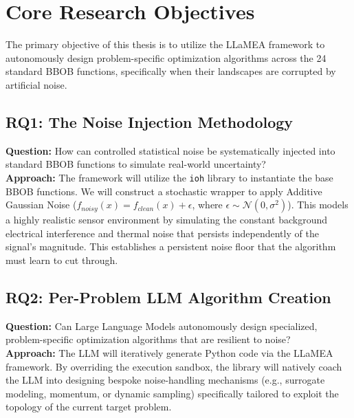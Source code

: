 
\chapter{Core Research Objectives}\label{chap:objectives}

The primary objective of this thesis is to utilize the LLaMEA framework to autonomously design problem-specific optimization algorithms across the 24 standard BBOB functions, specifically when their landscapes are corrupted by artificial noise.

\section{RQ1: The Noise Injection Methodology}
\textbf{Question:} How can controlled statistical noise be systematically injected into standard BBOB functions to simulate real-world uncertainty? \\
\textbf{Approach:} The framework will utilize the \texttt{ioh} library to instantiate the base BBOB functions. We will construct a stochastic wrapper to apply Additive Gaussian Noise ($f_{noisy}(x) = f_{clean}(x) + \epsilon$, where $\epsilon \sim \mathcal{N}(0, \sigma^2)$). This models a highly realistic sensor environment by simulating the constant background electrical interference and thermal noise that persists independently of the signal's magnitude. This establishes a persistent noise floor that the algorithm must learn to cut through.

\section{RQ2: Per-Problem LLM Algorithm Creation}
\textbf{Question:} Can Large Language Models autonomously design specialized, problem-specific optimization algorithms that are resilient to noise? \\
\textbf{Approach:} The LLM will iteratively generate Python code via the LLaMEA framework. By overriding the execution sandbox, the library will natively coach the LLM into designing bespoke noise-handling mechanisms (e.g., surrogate modeling, momentum, or dynamic sampling) specifically tailored to exploit the topology of the current target problem.

